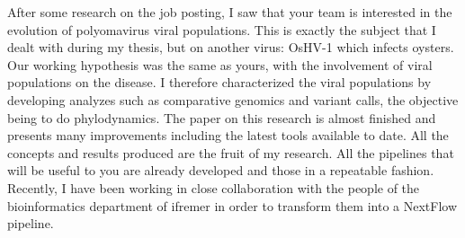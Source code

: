 \documentclass[11pt, a4paper]{awesome-cv}
\begin{document}
\begin{cvletter}
After some research on the job posting, I saw that your team is interested in the evolution of polyomavirus viral populations. This is exactly the subject that I dealt with during my thesis, but on another virus: OsHV-1 which infects oysters. Our working hypothesis was the same as yours, with the involvement of viral populations on the disease. I therefore characterized the viral populations by developing analyzes such as comparative genomics and variant calls, the objective being to do phylodynamics. The paper on this research is almost finished and presents many improvements including the latest tools available to date. All the concepts and results produced are the fruit of my research. All the pipelines that will be useful to you are already developed and those in a repeatable fashion. Recently, I have been working in close collaboration with the people of the bioinformatics department of ifremer in order to transform them into a NextFlow pipeline.

\end{cvletter}


\makeletterclosing
\end{document}
